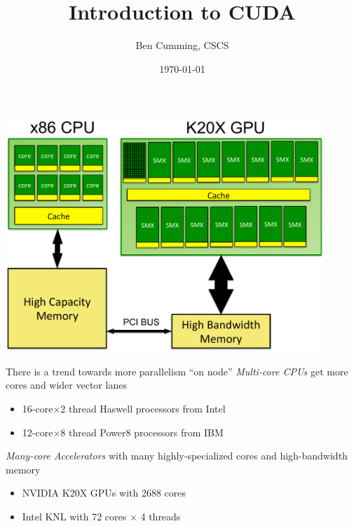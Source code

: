 \documentclass[aspectratio=43]{beamer}
\author{Ben Cumming, CSCS}
\title{Introduction to CUDA}
\subtitle{}
\date{\today}
\begin{document}
\cscstitle

\begin{frame}[fragile]{}
    \begin{center}
        \includegraphics[width=0.9\textwidth]{./images/node.pdf}
    \end{center}
\end{frame}

\begin{frame}[fragile]{}
    \begin{info}{There is a trend towards more parallelism ``on node''}
        \emph{Multi-core CPUs} get more cores and wider vector lanes
        \begin{itemize}
            \item 16-core$\times$2 thread Haswell processors from Intel
            \item 12-core$\times$8 thread Power8 processors from IBM
        \end{itemize}
        \emph{Many-core Accelerators} with many highly-specialized cores and high-bandwidth memory
        \begin{itemize}
            \item NVIDIA K20X GPUs with 2688 cores
            \item Intel KNL with 72 cores $\times$ 4 threads
        \end{itemize}
    \end{info}

\end{frame}
\end{document}
